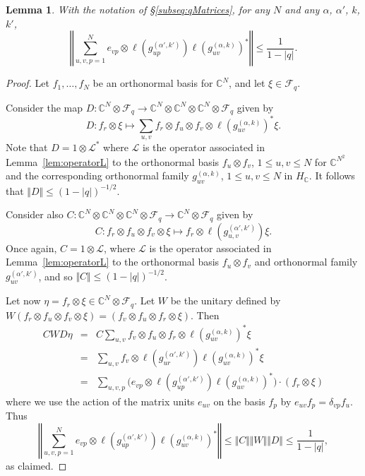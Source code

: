 \documentclass[11pt]{article}
\newtheorem{lemma}{Lemma}
\begin{document}
\begin{lemma} \label{lem:estimateOnSum} With the notation of \S\ref{subseq:qMatrices}, for any $N$ and any $\alpha$, $\alpha'$, $k$, $k'$, $$
\left\Vert \sum_{u,v,p=1}^N e_{vp} \otimes \ell(g_{up}^{(\alpha',k')}) 
    \ell(g_{uv}^{(\alpha,k)})^*  \right\Vert \leq \frac{1}{1-|q|}.$$
\end{lemma}
\begin{proof}
    Let $f_1,\dots,f_N$ be an orthonormal basis for $\mathbb{C}^N$, and let $\xi\in \mathscr{F}_q$.

    Consider the map 
    $
    D: \mathbb{C}^N \otimes \mathscr{F}_q \to \mathbb{C}^N \otimes \mathbb{C}^N \otimes \mathbb{C}^N \otimes \mathscr{F}_q
    $
    given by $$
    D :  f_r \otimes \xi \mapsto \sum_{u,v} f_r \otimes f_u \otimes f_v  \otimes \ell(g_{uv}^{(\alpha,k)})^*\xi.$$
    Note that $D = 1\otimes \mathscr{L}^*$ where $\mathscr{L}$ is the operator associated in Lemma~\ref{lem:operatorL} to the orthonormal basis $f_u\otimes f_v$, $1\leq u,v\leq N$ for $\mathbb{C}^{N^2}$ and the corresponding orthonormal family $g_{uv}^{(\alpha,k)}$, $1\leq u,v\leq N$ in $H_\mathbb{C}$. It follows that $\Vert D\Vert \leq (1-|q|)^{-1/2}$.

    Consider also $C : \mathbb{C}^N\otimes \mathbb{C}^N \otimes \mathbb{C}^N \otimes \mathscr{F}_q\to \mathbb{C}^N \otimes \mathscr{F}_q$ given by $$
    C: f_r \otimes f_u\otimes f_v  \otimes \xi \mapsto f_r \otimes \ell(g_{u,v}^{(\alpha',k')}) \xi.$$  Once again, $C = 1\otimes \mathscr{L}$, where $\mathscr{L}$ is the operator associated in Lemma~\ref{lem:operatorL} to the orthonormal basis $f_u\otimes f_v$ and orthonormal family $g_{uv}^{(\alpha',k')}$, and so $\Vert C\Vert \leq (1-|q|)^{-1/2}$. 

    Let now $\eta = f_r \otimes \xi \in \mathbb{C}^N\otimes \mathscr{F}_q$.  Let $W$ be the unitary defined by $W(f_r\otimes f_u\otimes f_v\otimes \xi)  = (f_v \otimes f_u \otimes f_r \otimes \xi)$. Then 
    \begin{eqnarray*}
    C W D \eta &=&  C \sum_{u,v} f_v \otimes f_u \otimes f_r \otimes \ell(g_{uv}^{(\alpha,k)})^* \xi \\
    &=& \sum_{u,v} f_v \otimes \ell(g_{ur}^{(\alpha',k')}) 
    \ell(g_{uv}^{(\alpha,k)})^* \xi  \\
    &=& \sum_{u,v,p} \bigl(e_{vp} \otimes \ell(g_{up}^{(\alpha',k')}) 
    \ell(g_{uv}^{(\alpha,k)})^*\bigr) \cdot (f_r \otimes \xi) 
    \end{eqnarray*} where we use the action of the matrix units $e_{uv}$ on the basis $f_p$ by $e_{uv} f_p = \delta_{vp} f_u$. 
    Thus 
    $$ \left\Vert \sum_{u,v,p=1}^N e_{vp} \otimes \ell(g_{up}^{(\alpha',k')}) 
    \ell(g_{uv}^{(\alpha,k)})^*  \right\Vert \leq \Vert C \Vert \Vert W\Vert \Vert D\Vert \leq 
    \frac{1}{1-|q|},
    $$
    as claimed.
\end{proof}
\end{document}
